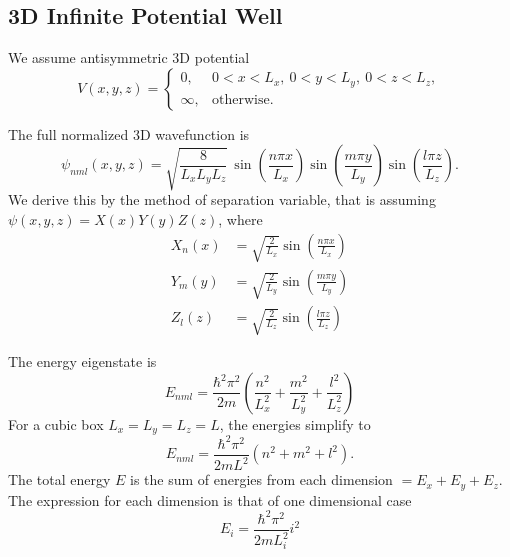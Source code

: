\documentclass[../../../main.tex]{subfiles}
\begin{document}
\subsection{3D Infinite Potential Well}
We assume antisymmetric 3D potential
\begin{equation*}
    V(x,y,z) =
    \begin{cases}
        0,      & 0 < x < L_x, \ 0 < y < L_y, \ 0 < z < L_z, \\
        \infty, & \text{otherwise}.
    \end{cases}
\end{equation*}

The full normalized 3D wavefunction is
\begin{equation*}
    \psi_{nml}(x,y,z) = \sqrt{\frac{8}{L_x L_y L_z}} \,
    \sin\left(\frac{n \pi x}{L_x}\right)
    \sin\left(\frac{m \pi y}{L_y}\right)
    \sin\left(\frac{l \pi z}{L_z}\right).
\end{equation*}
We derive this by the method of separation variable, that is assuming $\psi(x,y,z) = X(x) Y(y) Z(z)$, where
\begin{align*}
    X_n(x) & = \sqrt{\frac{2}{L_x}} \sin\left(\frac{n \pi x}{L_x}\right) \\
    Y_m(y) & = \sqrt{\frac{2}{L_y}} \sin\left(\frac{m \pi y}{L_y}\right) \\
    Z_l(z) & = \sqrt{\frac{2}{L_z}} \sin\left(\frac{l \pi z}{L_z}\right)
\end{align*}

The energy eigenstate is
\begin{equation*}
    E_{nml} =\frac{\hbar^2 \pi^2}{2 m} \left( \frac{n^2}{L_x^2} + \frac{m^2}{L_y^2} + \frac{l^2}{L_z^2} \right)
\end{equation*}
For a cubic box \(L_x = L_y = L_z = L\), the energies simplify to
\begin{equation*}
    E_{nml} = \frac{\hbar^2 \pi^2}{2 m L^2} (n^2 + m^2 + l^2).
\end{equation*}
The total energy $E$ is the sum of energies from each dimension $= E_x + E_y + E_z$.
The expression for each dimension is that of one dimensional case
\begin{equation*}
    E_i=\frac{\hbar^2 \pi^2 }{2mL_i^2}i^2
\end{equation*}
\end{document}
